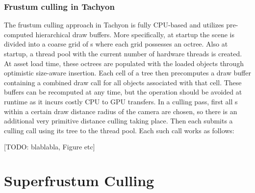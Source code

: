\subsubsection{Frustum culling in Tachyon}
The frustum culling approach in Tachyon is fully CPU-based and utilizes pre-computed hierarchical draw buffers. More specifically, at startup the scene is divided into a coarse grid of s where each grid possesses an octree. Also at startup, a thread pool with the current number of hardware threads is created. At asset load time, these octrees are populated with the loaded objects through optimistic size-aware insertion. Each cell of a tree then precomputes a draw buffer containing a combined draw call for all objects associated with that cell. These buffers can be recomputed at any time, but the operation should be avoided at runtime as it incurs costly CPU to GPU transfers. 
In a culling pass, first all s within a certain draw distance radius of the camera are chosen, so there is an additional very primitive distance culling taking place. Then each  submits a culling call using its tree to the thread pool. Each such call works as follows: 

[TODO: blablabla, Figure etc]

\section{Superfrustum Culling}
